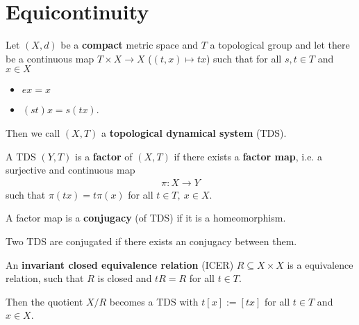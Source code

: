 \section{Equicontinuity}

\begin{frame}
	\begin{definition}
		Let $(X, d)$ be a \textbf{compact} metric space and $T$ a topological group and let there be a continuous map $T \times X \to X$ ($(t, x) \mapsto tx$) such that for all $s, t \in T$ and $x \in X$
		\begin{itemize}
			\item $ex = x$
			\item $(st)x = s(tx)$.
		\end{itemize}
		Then we call $(X, T)$ a \textbf{topological dynamical system} (TDS).
	\end{definition}
	\begin{overlayarea}{\textwidth}{3.5cm}
	\begin{minipage}{\textwidth}
	\end{minipage}
	\end{overlayarea}
\end{frame}

\begin{frame}
	\begin{definition}
		A TDS $(Y, T)$ is a \textbf{factor} of $(X, T)$ if there exists a \textbf{factor map}, i.e. a surjective and continuous map
		\begin{align*}
			\pi: X \to Y
		\end{align*}
		such that $\pi(tx) = t\pi(x)$ for all $t \in T,\ x \in X$.\pause
		
		A factor map is a \textbf{conjugacy} (of TDS) if it is a homeomorphism.
		
		Two TDS are conjugated if there exists an conjugacy between them.\pause
	\end{definition}
	\begin{definition}
		An \textbf{invariant closed equivalence relation} (ICER) $R \subseteq X \times X$ is a equivalence relation, such that $R$ is closed and $tR = R$ for all $t \in T$.\pause
		
		Then the quotient $X/R$ becomes a TDS with $t[x] := [tx]$ for all $t \in T$ and $x \in X$.
	\end{definition}
\end{frame}

